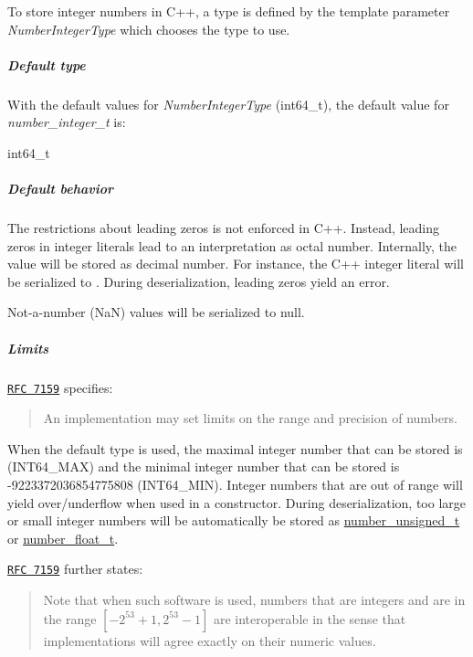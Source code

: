 To store integer numbers in C++, a type is defined by the template parameter {\itshape Number\+Integer\+Type} which chooses the type to use.

\subparagraph*{Default type}

With the default values for {\itshape Number\+Integer\+Type} ({\ttfamily int64\+\_\+t}), the default value for {\itshape number\+\_\+integer\+\_\+t} is\+:


\begin{DoxyCode}
int64\_t
\end{DoxyCode}


\subparagraph*{Default behavior}


\begin{DoxyItemize}
\item The restrictions about leading zeros is not enforced in C++. Instead, leading zeros in integer literals lead to an interpretation as octal number. Internally, the value will be stored as decimal number. For instance, the C++ integer literal {} will be serialized to {}. During deserialization, leading zeros yield an error.
\item Not-\/a-\/number (NaN) values will be serialized to {\ttfamily null}.
\end{DoxyItemize}

\subparagraph*{Limits}

\href{http://rfc7159.net/rfc7159}{\tt R\+FC 7159} specifies\+: \begin{quote}
An implementation may set limits on the range and precision of numbers. \end{quote}


When the default type is used, the maximal integer number that can be stored is {} (I\+N\+T64\+\_\+\+M\+AX) and the minimal integer number that can be stored is {\ttfamily -\/9223372036854775808} (I\+N\+T64\+\_\+\+M\+IN). Integer numbers that are out of range will yield over/underflow when used in a constructor. During deserialization, too large or small integer numbers will be automatically be stored as \hyperlink{classnlohmann_1_1basic__json_ab906e29b5d83ac162e823ada2156b989}{number\+\_\+unsigned\+\_\+t} or \hyperlink{classnlohmann_1_1basic__json_a88d6103cb3620410b35200ee8e313d97}{number\+\_\+float\+\_\+t}.

\href{http://rfc7159.net/rfc7159}{\tt R\+FC 7159} further states\+: \begin{quote}
Note that when such software is used, numbers that are integers and are in the range $[-2^{53}+1, 2^{53}-1]$ are interoperable in the sense that implementations will agree exactly on their numeric values. \end{quote}


